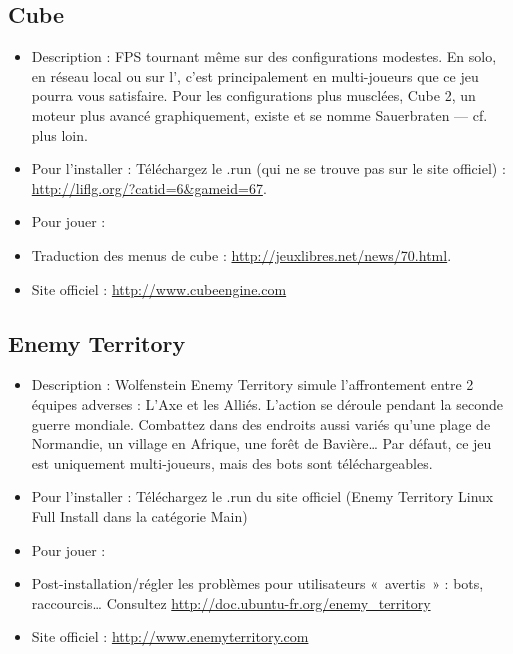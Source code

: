 \subsection{Cube}
\begin{itemize}
\begingroup
{}
\item Description : FPS tournant même sur des configurations modestes. En solo, en réseau local ou sur l', c'est principalement en multi-joueurs que ce jeu pourra vous satisfaire. Pour les configurations plus musclées, Cube 2, un moteur plus avancé graphiquement, existe et se nomme Sauerbraten --- cf. plus loin.{\par}
\endgroup
\item Pour l'installer : Téléchargez le .run (qui ne se trouve pas sur le site officiel) : \url{http://liflg.org/?catid=6&gameid=67}.{\par}
\item Pour jouer : 
\item Traduction des menus de cube : \url{http://jeuxlibres.net/news/70.html}.{\par}
\item Site officiel : \url{http://www.cubeengine.com}{\par}
\end{itemize}
\subsection{Enemy Territory}
\begin{itemize}
\begingroup
{}
\item Description : Wolfenstein Enemy Territory simule l'affrontement entre 2 équipes adverses : L'Axe et les Alliés. L'action se déroule pendant la seconde guerre mondiale. Combattez dans des endroits aussi variés qu'une plage de Normandie, un village en Afrique, une forêt de Bavière\ldots{} Par défaut, ce jeu est uniquement multi-joueurs, mais des bots sont téléchargeables.{\par}
\endgroup
\item Pour l'installer : Téléchargez le .run du site officiel (Enemy Territory Linux  Full Install dans la catégorie Main){\par}
\item Pour jouer : 
\item Post-installation/régler les problèmes pour utilisateurs «~avertis~» : bots, raccourcis\ldots{} Consultez \url{http://doc.ubuntu-fr.org/enemy_territory}{\par}
\item Site officiel : \url{http://www.enemyterritory.com}{\par}
\end{itemize}
